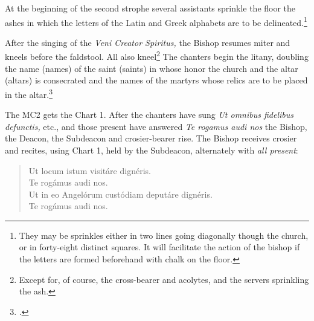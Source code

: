 \documentclass[letterpaper]{report}
\begin{document}
{\rubric At the beginning of the second strophe several assistants sprinkle the
floor the ashes in which the letters of the Latin and Greek alphabets are to be
delineated.\footnote{They may be sprinkles either in two lines going diagonally
though the church, or in forty-eight distinct squares. It will facilitate the
action of the bishop if the letters are formed beforehand with chalk on the
floor.}

\rubric After the singing of the \textit{Veni Creator Spiritus,} the Bishop
resumes miter and kneels before the faldstool. All also kneel\footnote{Except
for, of course, the cross-bearer and acolytes, and the servers sprinkling the
ash.} The chanters begin the litany, doubling the name (names) of the saint
(saints) in whose honor the church and the altar (altars) is consecrated and
the names of the martyrs whose relics are to be placed in the
altar.\footcite[If the name of any of these saints is inscried in the litany,
e.g., St. Peter, St. Stephen, it is invoked a second time immediately after the
proper invocation in the Litany. If the name is not in the Litany, it is
inserted after the \textit{individual} invocations of the saints of the same
category, but before the general invocation, e.g., if the church is consecrated
in honor of St. Francis de Sales, his name is inserted twice after
\textit{Sancte Nicol\ae} and before \textit{Omnes sancti Pontifices et
Confessores.} If the church or altar is consecrated in honor of the Blessed
Virgin under any title whatever the invocation \textit{Sancta Maria} is
mentioned twice; if in honor of a mystery of the Life and Passion of Our Lord,
the petition \textit{Fili Redemptor mundi Deus} is repeated.][Note, p.
51.]{consecranda}

\rubric The MC2 gets the Chart 1. After the chanters have sung \textit{Ut
omnibus fidelibus defunctis,} etc., and those present have answered \textit{Te
rogamus audi nos} the Bishop, the Deacon, the Subdeacon and crosier-bearer
rise. The Bishop receives crosier and recites, using Chart 1, held by the
Subdeacon, alternately with \textit{all present}:

\begin{quote}
    \vbar Ut locum istum visitáre dignéris.\\
    \rbar Te rogámus audi nos.\\
    \vbar Ut in eo Angelórum custódiam deputáre dignéris.\\
    \rbar Te rogámus audi nos.\\
\end{quote}

}
\end{document}
